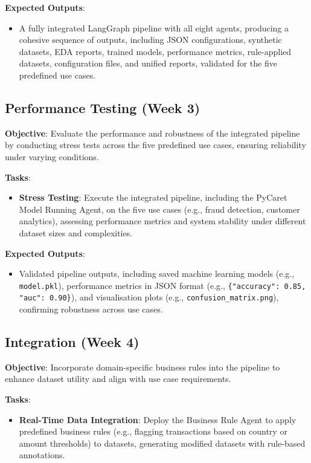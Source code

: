 \documentclass{article}
\begin{document}
\textbf{Expected Outputs}:
\begin{itemize}[label=--]
    \item A fully integrated LangGraph pipeline with all eight agents, producing a cohesive sequence of outputs, including JSON configurations, synthetic datasets, EDA reports, trained models, performance metrics, rule-applied datasets, configuration files, and unified reports, validated for the five predefined use cases.
\end{itemize}

\subsection{Performance Testing (Week 3)}
\textbf{Objective}: Evaluate the performance and robustness of the integrated pipeline by conducting stress tests across the five predefined use cases, ensuring reliability under varying conditions.

\textbf{Tasks}:
\begin{itemize}[label=--]
    \item \textbf{Stress Testing}: Execute the integrated pipeline, including the PyCaret Model Running Agent, on the five use cases (e.g., fraud detection, customer analytics), assessing performance metrics and system stability under different dataset sizes and complexities.
\end{itemize}

\textbf{Expected Outputs}:
\begin{itemize}[label=--]
    \item Validated pipeline outputs, including saved machine learning models (e.g., \texttt{model.pkl}), performance metrics in JSON format (e.g., \texttt{\{"accuracy": 0.85, "auc": 0.90\}}), and visualisation plots (e.g., \texttt{confusion\_matrix.png}), confirming robustness across use cases.
\end{itemize}

\subsection{Integration (Week 4)}
\textbf{Objective}: Incorporate domain-specific business rules into the pipeline to enhance dataset utility and align with use case requirements.

\textbf{Tasks}:
\begin{itemize}[label=--]
    \item \textbf{Real-Time Data Integration}: Deploy the Business Rule Agent to apply predefined business rules (e.g., flagging transactions based on country or amount thresholds) to datasets, generating modified datasets with rule-based annotations.
\end{itemize}
\end{document}
